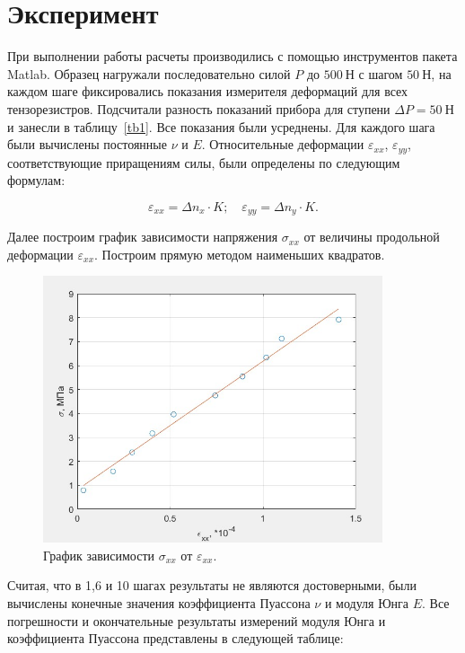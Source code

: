 \documentclass[12pt, a4paper]{article}
\begin{document}
    \newpage
    
    \section{Эксперимент}
    
    При выполнении работы расчеты производились с помощью инструментов пакета Matlab. Образец нагружали последовательно силой $P$ до $500~\text{Н}$ с шагом $50~\text{Н}$, на каждом шаге фиксировались показания измерителя деформаций для всех тензорезистров. Подсчитали разность показаний прибора для ступени $\Delta P = 50~\text{Н}$ и занесли в таблицу~\ref{tb1}. Все показания были усреднены. Для каждого шага были вычислены постоянные $\nu$ и $E$. Относительные деформации $\varepsilon_{xx}$, $\varepsilon_{yy}$, соответствующие приращениям силы, были определены по следующим формулам:
    
    \begin{equation}
        \varepsilon_{xx} = \Delta n_{x} \cdot K; \quad \varepsilon_{yy} = \Delta n_{y} \cdot K.
    \end{equation}
    
    Далее построим график зависимости напряжения $\sigma_{xx}$ от величины продольной деформации $\varepsilon_{xx}$. Построим прямую методом наименьших квадратов.
    
    \begin{figure}[h]
        \centering
        \includegraphics[width = 10cm]{image_4.jpg}
        \caption{График зависимости $\sigma_{xx}$ от $\varepsilon_{xx}$.}
        \label{im4}
    \end{figure}
    
    Считая, что в 1,6 и 10 шагах результаты не являются достоверными, были вычислены конечные значения коэффициента Пуассона $\nu$ и модуля Юнга $E$. Все погрешности и окончательные результаты измерений модуля Юнга и коэффициента Пуассона представлены в следующей таблице:
    
\end{document}

